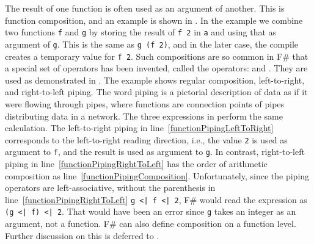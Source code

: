 \documentclass[fsharpNotes.tex]{subfiles}
\begin{document}
\label{page:piping}
The result of one function is often used as an argument of another. This is function composition, and an example is shown in .
%
%
In the example we combine two functions \lstinline{f} and \lstinline{g} by storing the result of \lstinline{f 2} in \lstinline{a} and using that as argument of \lstinline{g}. This is the same as \lstinline{g (f 2)}, and in the later case, the compile creates a temporary value for \lstinline{f 2}. Such compositions are so common in F\# that a special set of operators has been invented, called the  operators: \idx[{|>}@\lstinline{|>}]{\lexeme{|>}} and \idx[{<|}@\lstinline{<|}]{\lexeme{<|}}. They are used as demonstrated in .
%
%
The example shows regular composition, left-to-right, and right-to-left piping. The word piping is a pictorial description of data as if it were flowing through pipes, where functions are connection points of pipes distributing data in a network. The three expressions in  perform the same calculation. The left-to-right piping in line~\ref{functionPipingLeftToRight} corresponds to the left-to-right reading direction, i.e., the value \lstinline{2} is used as argument to \lstinline{f}, and the result is used as argument to \lstinline{g}. In contrast, right-to-left piping in line~\ref{functionPipingRightToLeft} has the order of arithmetic composition as line~\ref{functionPipingComposition}. Unfortunately, since the piping operators are left-associative, without the parenthesis in line~\ref{functionPipingRightToLeft} \mbox{\lstinline{g <| f <| 2}}, F\# would read the expression as \lstinline{(g <| f) <| 2}. That would have been an error since \lstinline{g} takes an integer as an argument, not a function. F\# can also define composition on a function level. Further discussion on this is deferred to .

\end{document}
